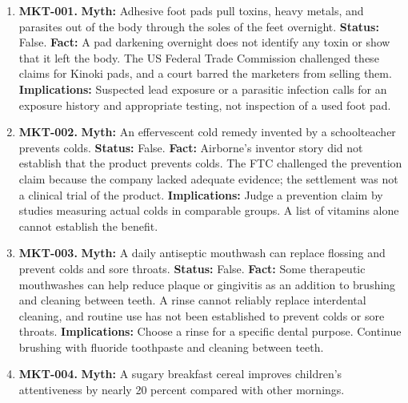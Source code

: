 \documentclass[11pt,oneside]{book}
\begin{document}
\begin{enumerate}[leftmargin=0pt,labelwidth=0pt,labelsep=0pt,itemindent=0pt]

\item[] \textbf{MKT-001.} \textbf{Myth:} Adhesive foot pads pull toxins, heavy metals, and parasites out of the body through the soles of the feet overnight.\newline
\textbf{Status:} False.\newline
\textbf{Fact:} A pad darkening overnight does not identify any toxin or show that it left the body. The US Federal Trade Commission challenged these claims for Kinoki pads, and a court barred the marketers from selling them. \cite{ref83,ref84}\newline
\textbf{Implications:} Suspected lead exposure or a parasitic infection calls for an exposure history and appropriate testing, not inspection of a used foot pad.
\item[] \textbf{MKT-002.} \textbf{Myth:} An effervescent cold remedy invented by a schoolteacher prevents colds.\newline
\textbf{Status:} False.\newline
\textbf{Fact:} Airborne's inventor story did not establish that the product prevents colds. The FTC challenged the prevention claim because the company lacked adequate evidence; the settlement was not a clinical trial of the product. \cite{ref464}\newline
\textbf{Implications:} Judge a prevention claim by studies measuring actual colds in comparable groups. A list of vitamins alone cannot establish the benefit.
\item[] \textbf{MKT-003.} \textbf{Myth:} A daily antiseptic mouthwash can replace flossing and prevent colds and sore throats.\newline
\textbf{Status:} False.\newline
\textbf{Fact:} Some therapeutic mouthwashes can help reduce plaque or gingivitis as an addition to brushing and cleaning between teeth. A rinse cannot reliably replace interdental cleaning, and routine use has not been established to prevent colds or sore throats. \cite{ref86,ref44}\newline
\textbf{Implications:} Choose a rinse for a specific dental purpose. Continue brushing with fluoride toothpaste and cleaning between teeth.
\item[] \textbf{MKT-004.} \textbf{Myth:} A sugary breakfast cereal improves children's attentiveness by nearly 20 percent compared with other mornings.\newline

\end{enumerate}
\end{document}

